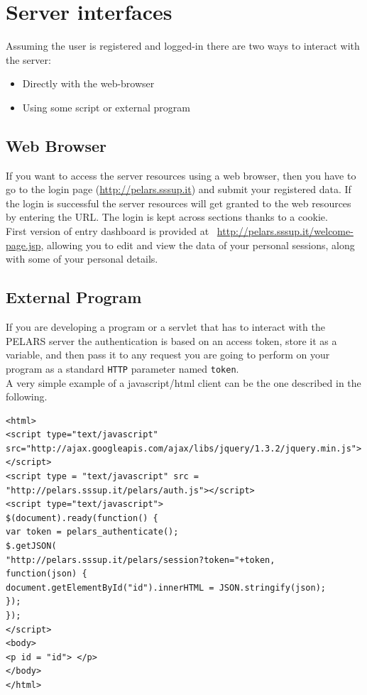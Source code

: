 \documentclass[a4paper,notitlepage,onecolumn]{hitec}  %
\begin{document}
\section{Server interfaces}
Assuming the user is registered and logged-in there are two ways to interact with the server:
\begin{itemize}
\item Directly with the web-browser
\item Using some script or external program
\end{itemize}

\subsection{Web Browser}
If you want to access the server resources using a web browser, then you have to go to the login page (\url{http://pelars.sssup.it}) and submit your registered data. If the login is successful the server resources will get granted to the web resources by entering the URL. The login is kept across sections thanks to a cookie. \\
First version of entry dashboard is provided at   \ \url{http://pelars.sssup.it/welcome-page.jsp}, allowing you to edit and view the data of your personal sessions, along with some of your personal details.

\subsection{External Program}
If you are developing a program or a servlet that has to interact with the PELARS server the authentication is based on an access token, store it as a variable, and then pass it to any request you are going to perform on your program as a standard {\tt HTTP} parameter named {\tt token}. \\
A very simple example of a javascript/html client can be the one described in the following.\\

\begin{lstlisting}[language=HTML5,firstnumber=1]
<html>
<script type="text/javascript"
src="http://ajax.googleapis.com/ajax/libs/jquery/1.3.2/jquery.min.js"></script>
<script type = "text/javascript" src = "http://pelars.sssup.it/pelars/auth.js"></script>
<script type="text/javascript">
$(document).ready(function() { 
var token = pelars_authenticate();
$.getJSON(
"http://pelars.sssup.it/pelars/session?token="+token,
function(json) {
document.getElementById("id").innerHTML = JSON.stringify(json);
});
});
</script>
<body>
<p id = "id"> </p>
</body>
</html>
\end{lstlisting}
\end{document}
